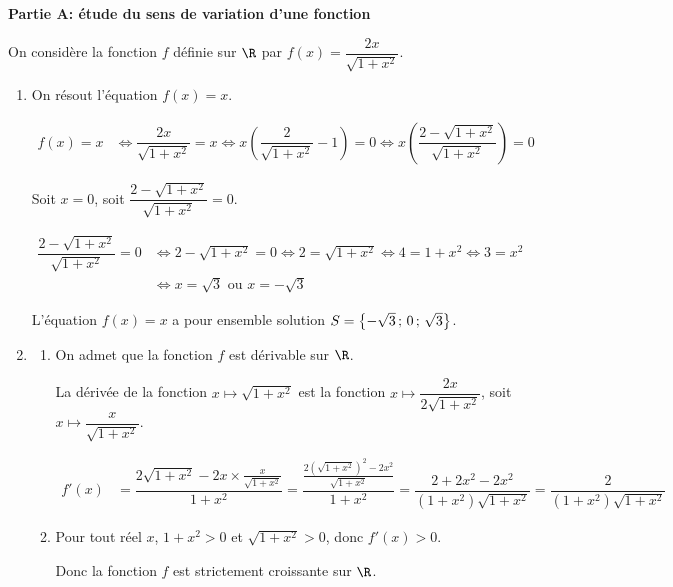 \textbf{Partie A: étude du sens de variation d'une fonction}

\medskip

On considère la fonction $f$ définie sur $\R$ par 
$f(x) = \dfrac{2x}{\sqrt{1 + x^2}}$.

\begin{enumerate}
\item On résout l'équation $f(x) = x$.

$\begin{aligned}
f(x)=x
& \iff  \dfrac{2x}{\sqrt{1 + x^2}} =x
\iff x\left ( \dfrac{2}{\sqrt{1 + x^2}} - 1\right )=0
\iff x \left (\dfrac{2-\sqrt{1+x^2}}{\sqrt{1+x^2}}\right )=0
\end{aligned}$

Soit $x=0$, soit $\dfrac{2-\sqrt{1+x^2}}{\sqrt{1+x^2}}=0$.

$\begin{aligned}
\dfrac{2-\sqrt{1+x^2}}{\sqrt{1+x^2}}=0
& \iff 2-\sqrt{1+x^2}=0
\iff 2=\sqrt{1+x^2}
\iff 4=1+x^2
\iff 3=x^2\\
& \iff x=\sqrt{3}  \text{ ou } x=-\sqrt{3}
\end{aligned}$

L'équation $f(x)=x$ a pour ensemble solution $S=\left \{ -\sqrt{3}\,;\,0\,;\,\sqrt{3}\strut \right \}$.

\item
	\begin{enumerate}
		\item On admet que la fonction $f$ est dérivable sur $\R$.

La dérivée de la fonction $x \longmapsto \sqrt{1+x^2}$ est la fonction $x \longmapsto \dfrac{2x}{2\sqrt{1+x^2}}$, soit $x \longmapsto \dfrac{x}{\sqrt{1+x^2}}$.

$\begin{aligned}
f'(x)
& = \dfrac{2\sqrt{1+x^2} - 2x\times\frac{x}{\sqrt{1+x^2}}}{1+x^2}
= \dfrac{\frac{2\left ( \sqrt{1+x^2}\right )^2-2x^2}{\sqrt{1+x^2}}}{1+x^2}
= \dfrac{2+2x^2-2x^2}{\left (1+x^2\right ) \sqrt{1+x^2}}
= \dfrac{2}{\left (1+x^2\right ) \sqrt{1+x^2}}
\end{aligned}$


		\item 
Pour tout réel $x$, $1+x^2>0$ et $\sqrt{1+x^2}>0$, donc $f'(x)>0$.

Donc la fonction $f$ est strictement croissante sur $\R$.
	\end{enumerate}
\end{enumerate}

\medskip

